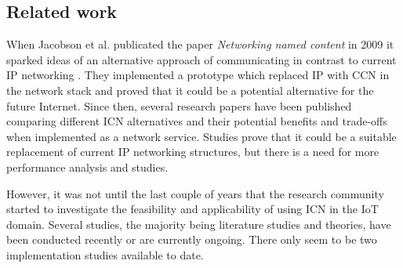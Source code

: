 \subsection{Related work}

When Jacobson et al. publicated the paper \textit{Networking named content} in 2009 it sparked ideas of an alternative approach of communicating in contrast to current IP networking \cite{Jacobson2009}. They implemented a prototype which replaced IP with CCN in the network stack and proved that it could be a potential alternative for the future Internet.
Since then, several research papers have been published comparing different ICN alternatives and their potential benefits and trade-offs when implemented as a network service\cite{Ahlgren2012}. Studies prove that it could be a suitable replacement of current IP networking structures, but there is a need for more performance analysis and studies\cite{Ahlgren2012}\cite{Greek-ICN-networking-survey-2014}.

However, it was not until the last couple of years that the research community started to investigate the feasibility and applicability of using ICN in the IoT domain. Several studies, the majority being literature studies and theories, have been conducted recently or are currently ongoing. There only seem to be two implementation studies available to date.

